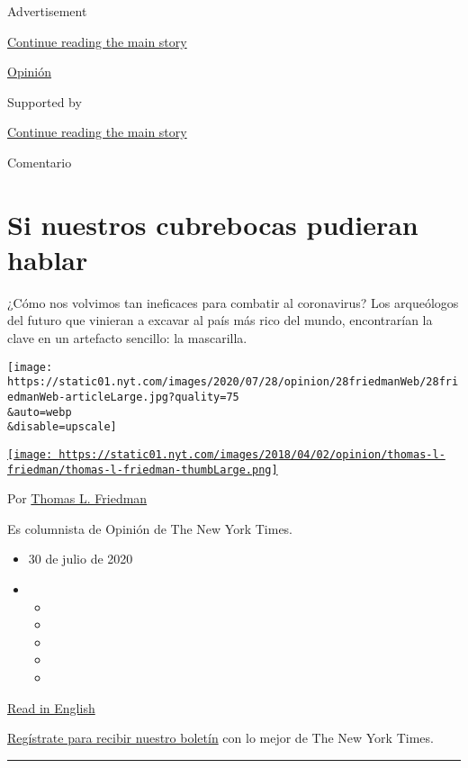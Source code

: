 Advertisement

\protect\hyperlink{after-top}{Continue reading the main story}

\href{/es/section/opinion}{Opinión}

Supported by

\protect\hyperlink{after-sponsor}{Continue reading the main story}

Comentario

\hypertarget{si-nuestros-cubrebocas-pudieran-hablar}{%
\section{Si nuestros cubrebocas pudieran
hablar}\label{si-nuestros-cubrebocas-pudieran-hablar}}

¿Cómo nos volvimos tan ineficaces para combatir al coronavirus? Los
arqueólogos del futuro que vinieran a excavar al país más rico del
mundo, encontrarían la clave en un artefacto sencillo: la mascarilla.

\texttt{[image: https://static01.nyt.com/images/2020/07/28/opinion/28friedmanWeb/28friedmanWeb-articleLarge.jpg?quality=75\\\&auto=webp\\\&disable=upscale]}

\href{https://www.nytimes.com/by/thomas-l-friedman}{\texttt{[image: https://static01.nyt.com/images/2018/04/02/opinion/thomas-l-friedman/thomas-l-friedman-thumbLarge.png]}}

Por \href{https://www.nytimes.com/by/thomas-l-friedman}{Thomas L.
Friedman}

Es columnista de Opinión de The New York Times.

\begin{itemize}
\item
  30 de julio de 2020
\item
  \begin{itemize}
  \item
  \item
  \item
  \item
  \item
  \end{itemize}
\end{itemize}

\href{https://www.nytimes.com/2020/07/28/opinion/coronavirus-masks.html}{Read
in English}

\href{https://www.nytimes.com/newsletters/el-times}{Regístrate para
recibir nuestro boletín} con lo mejor de The New York Times.

\begin{center}\rule{0.5\linewidth}{\linethickness}\end{center}

